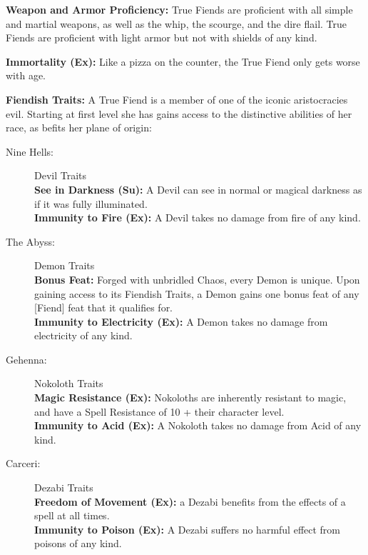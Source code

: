 \goodbab{}
\goodfor{}
\goodref{}
\goodwil{}

\begin{classtable}
\levelsix{--}
\levelten{--}
\levelfourteen{--}
\leveleighteen{--}
\end{classtable}

\classfeatures

\textbf{Weapon and Armor Proficiency:} True Fiends are proficient with all simple and martial weapons, as well as the whip, the scourge, and the dire flail. True Fiends are proficient with light armor but not with shields of any kind.

\textbf{Immortality (Ex):} Like a pizza on the counter, the True Fiend only gets worse with age.

\textbf{Fiendish Traits:} A True Fiend is a member of one of the iconic aristocracies evil. Starting at first level she has gains access to the distinctive abilities of her race, as befits her plane of origin:

\begin{description}
\item[Nine Hells:] Devil Traits\\
\textbf{See in Darkness (Su):} A Devil can see in normal or magical darkness as if it was fully illuminated.\\
\textbf{Immunity to Fire (Ex):} A Devil takes no damage from fire of any kind.

\item[The Abyss:] Demon Traits\\
\textbf{Bonus Feat:} Forged with unbridled Chaos, every Demon is unique. Upon gaining access to its Fiendish Traits, a Demon gains one bonus feat of any [Fiend] feat that it qualifies for.\\
\textbf{Immunity to Electricity (Ex):} A Demon takes no damage from electricity of any kind.

\item[Gehenna:] Nokoloth Traits\\
\textbf{Magic Resistance (Ex):} Nokoloths are inherently resistant to magic, and have a Spell Resistance of 10 + their character level.\\
\textbf{Immunity to Acid (Ex):} A Nokoloth takes no damage from Acid of any kind.

\item[Carceri:] Dezabi Traits\\
\textbf{Freedom of Movement (Ex):} a Dezabi benefits from the effects of a  spell at all times.\\
\textbf{Immunity to Poison (Ex):} A Dezabi suffers no harmful effect from poisons of any kind.
\end{description}

